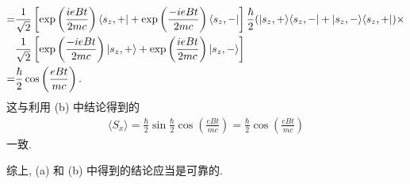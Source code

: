 \documentclass{assignment}
\begin{document}
\begin{sol}
\begin{itemize}
\begin{itemize}
\begin{align}
                \notag=&\frac{1}{\sqrt{2}}\left[\exp\left(\frac{ieBt}{2mc}\right)\langle s_z,+\rvert+\exp\left(\frac{-ieBt}{2mc}\right)\langle s_z,-\rvert\right]\frac{\hbar}{2}(\lvert s_z,+\rangle\langle s_z,-\rvert+\lvert s_z,-\rangle\langle s_z,+\rvert)\times\\
                \notag&\frac{1}{\sqrt{2}}\left[\exp\left(\frac{-ieBt}{2mc}\right)\lvert s_z,+\rangle+\exp\left(\frac{ieBt}{2mc}\right)\lvert s_z,-\rangle\right]\\
                =&\frac{\hbar}{2}\cos\left(\frac{eBt}{mc}\right).
            \end{align}
            这与利用 (b) 中结论得到的
            \begin{align}
                \langle S_x\rangle=\frac{\hbar}{2}\sin\frac{\hbar}{2}\cos\left(\frac{eBt}{mc}\right)=\frac{\hbar}{2}\cos\left(\frac{eBt}{mc}\right)
            \end{align}
            一致.
        \end{itemize}
        综上, (a) 和 (b) 中得到的结论应当是可靠的.
    \end{itemize}
\end{sol}
\end{document}
